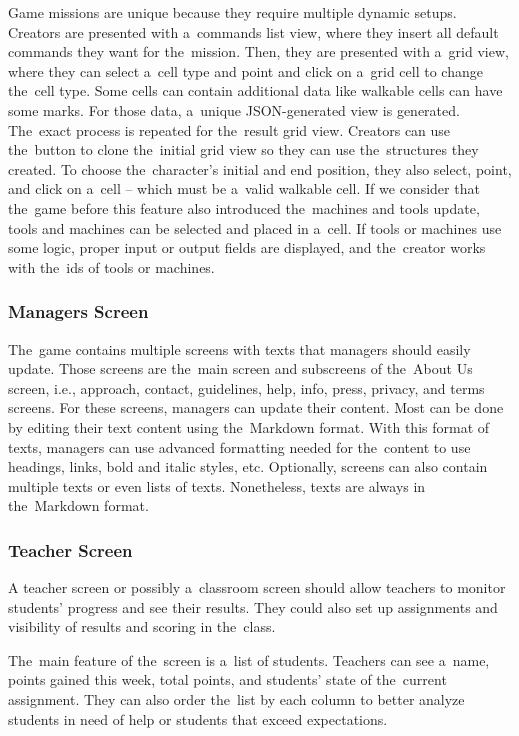 Game missions are unique because they require multiple dynamic setups.
Creators are presented with a~commands list view, where they insert all default commands they want for the~mission.
Then, they are presented with a~grid view, where they can select a~cell type and point and click on a~grid cell to change the~cell type.
Some cells can contain additional data like walkable cells can have some marks.
For those data, a~unique JSON-generated view is generated.
The~exact process is repeated for the~result grid view.
Creators can use the~button to clone the~initial grid view so they can use the~structures they created.
To choose the~character's initial and end position, they also select, point, and click on a~cell -- which must be a~valid walkable cell.
If we consider that the~game before this feature also introduced the~machines and tools update, tools and machines can be selected and placed in a~cell.
If tools or machines use some logic, proper input or output fields are displayed, and the~creator works with the~ids of tools or machines.

\subsubsection{Managers Screen}

The~game contains multiple screens with texts that managers should easily update.
Those screens are the~main screen and subscreens of the~About Us screen, i.e., approach, contact, guidelines, help, info, press, privacy, and terms screens.
For these screens, managers can update their content.
Most can be done by editing their text content using the~Markdown format.
With this format of texts, managers can use advanced formatting needed for the~content to use headings, links, bold and italic styles, etc.
Optionally, screens can also contain multiple texts or even lists of texts.
Nonetheless, texts are always in the~Markdown format.

\subsubsection{Teacher Screen}

A teacher screen or possibly a~classroom screen should allow teachers to monitor students' progress and see their results.
They could also set up assignments and visibility of results and scoring in the~class.

The~main feature of the~screen is a~list of students.
Teachers can see a~name, points gained this week, total points, and students' state of the~current assignment.
They can also order the~list by each column to better analyze students in need of help or students that exceed expectations.

